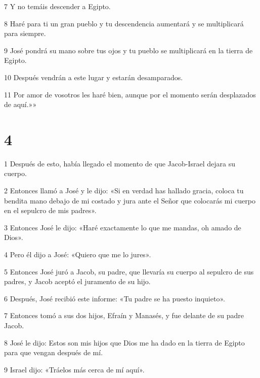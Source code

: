 \par 7 Y no temáis descender a Egipto.

\par 8 Haré para ti un gran pueblo y tu descendencia aumentará y se multiplicará para siempre.

\par 9 José pondrá su mano sobre tus ojos y tu pueblo se multiplicará en la tierra de Egipto.

\par 10 Después vendrán a este lugar y estarán desamparados.

\par 11 Por amor de vosotros les haré bien, aunque por el momento serán desplazados de aquí.»»

\chapter{4}

\par 1 Después de esto, había llegado el momento de que Jacob-Israel dejara su cuerpo.

\par 2 Entonces llamó a José y le dijo: «Si en verdad has hallado gracia, coloca tu bendita mano debajo de mi costado y jura ante el Señor que colocarás mi cuerpo en el sepulcro de mis padres».

\par 3 Entonces José le dijo: «Haré exactamente lo que me mandas, oh amado de Dios».

\par 4 Pero él dijo a José: «Quiero que me lo jures».

\par 5 Entonces José juró a Jacob, su padre, que llevaría su cuerpo al sepulcro de sus padres, y Jacob aceptó el juramento de su hijo.

\par 6 Después, José recibió este informe: «Tu padre se ha puesto inquieto».

\par 7 Entonces tomó a sus dos hijos, Efraín y Manasés, y fue delante de su padre Jacob.

\par 8 José le dijo: Estos son mis hijos que Dios me ha dado en la tierra de Egipto para que vengan después de mí.

\par 9 Israel dijo: «Tráelos más cerca de mí aquí».

